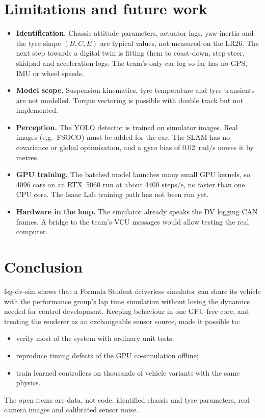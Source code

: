 \documentclass[11pt]{article}
\begin{document}
\section{Limitations and future work}\label{sec:limits}
\begin{itemize}
  \item \textbf{Identification.} Chassis attitude parameters, actuator lags, yaw inertia and the tyre shape
        $(B,C,E)$ are typical values, not measured on the LR26. The next step towards a digital twin is fitting
        them to coast-down, step-steer, skidpad and acceleration logs. The team's only car log so far has no GPS,
        IMU or wheel speeds.
  \item \textbf{Model scope.} Suspension kinematics, tyre temperature and tyre transients are not modelled. Torque
        vectoring is possible with double track but not implemented.
  \item \textbf{Perception.} The YOLO detector is trained on simulator images. Real images (e.g.\ FSOCO) must be
        added for the car. The SLAM has no covariance or global optimisation, and a gyro bias of
        \SI{0.02}{rad/s} moves it by metres.
  \item \textbf{GPU training.} The batched model launches many small GPU kernels, so 4096 cars on an RTX~5060 run
        at about 4400 steps/s, no faster than one CPU core. The Isaac Lab training path has not been run yet.
  \item \textbf{Hardware in the loop.} The simulator already speaks the DV logging CAN frames. A bridge to the
        team's VCU messages would allow testing the real computer.
\end{itemize}

\section{Conclusion}
fsg-dv-sim shows that a Formula Student driverless simulator can share its vehicle with the performance group's
lap time simulation without losing the dynamics needed for control development. Keeping behaviour in one GPU-free
core, and treating the renderer as an exchangeable sensor source, made it possible to:
\begin{itemize}
  \item verify most of the system with ordinary unit tests;
  \item reproduce timing defects of the GPU co-simulation offline;
  \item train learned controllers on thousands of vehicle variants with the same physics.
\end{itemize}
The open items are data, not code: identified chassis and tyre parameters, real camera images and calibrated
sensor noise.
\end{document}
